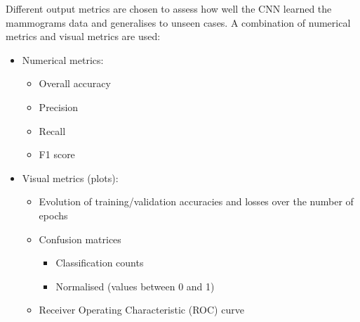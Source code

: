 Different output metrics are chosen to assess how well the CNN learned the mammograms data and generalises to unseen cases. A combination of numerical metrics and visual metrics are used:

\begin{itemize}
    \item Numerical metrics:
    \begin{itemize}
        \item Overall accuracy
        \item Precision
        \item Recall
        \item F1 score
    \end{itemize}
    \item Visual metrics (plots):
    \begin{itemize}
        \item Evolution of training/validation accuracies and losses over the number of epochs
        \item Confusion matrices
        \begin{itemize}
            \item Classification counts
            \item Normalised (values between 0 and 1)
        \end{itemize}
        \item Receiver Operating Characteristic (ROC) curve
    \end{itemize}
\end{itemize}
